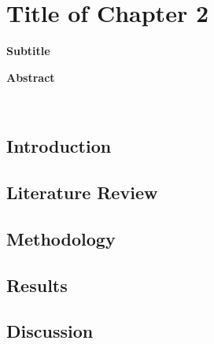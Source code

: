 \chapter{Title of Chapter 2} \label{cha:ch2}
{\noindent \Large \textbf{Subtitle}}
\vspace{1cm}


\therule
\centerline{\textbf{Abstract}} \\
 \par
\therule

\section{Introduction} \label{sec:ch2_introduction}
    

\section{Literature Review} \label{sec:ch2_literature}
    

\section{Methodology} \label{sec:ch2_methodology}
    

\section{Results} \label{sec:ch2_results}
    
    
\section{Discussion}
\label{sec:ch2_discussion}
    

